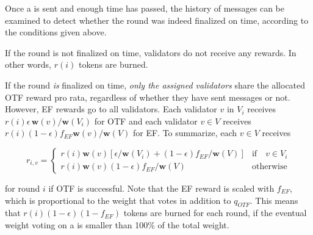 Once a \PROP is sent and enough time has passed, the history of messages can be examined to detect whether the round was indeed finalized on time, according to the conditions given above.

If the round is not finalized on time, validators do not receive any rewards. In other words, $r(i)$ tokens are burned.

If the round \emph{is} finalized on time, \emph{only the assigned validators} share the allocated OTF reward pro rata, regardless of whether they have sent messages or not. However, EF rewards go to all validators. Each validator $v$ in $V_i$ receives $r(i)\epsilon \,\boldsymbol{w}(v)/\boldsymbol{w}(V_i)$ for OTF and each validator $v\in V$ receives $r(i)(1-\epsilon)f_{EF}\boldsymbol{w}(v)/\boldsymbol{w}(V)$ for EF. To summarize, each $v\in V$ receives

\begin{equation}
  r_{i,v} = \begin{cases} r(i)\boldsymbol{w}(v)[\epsilon/\boldsymbol{w}(V_i) + (1-\epsilon)f_{EF}/\boldsymbol{w}(V)] &\text{if}\quad v\in V_i\\
    r(i)\boldsymbol{w}(v)(1-\epsilon)f_{EF}/\boldsymbol{w}(V) & \text{otherwise}
  \end{cases}
\end{equation}

for round $i$ if OTF is successful. Note that the EF reward is scaled with $f_{EF}$, which is proportional to the weight that votes in addition to $q_{OTF}$. This means that $r(i)(1-\epsilon)(1-f_{EF})$ tokens are burned for each round, if the eventual weight voting on a \PROP is smaller than 100\% of the total weight.




